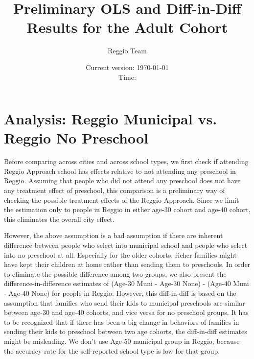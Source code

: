 



\title{Preliminary OLS and Diff-in-Diff Results for the Adult Cohort}
\author{Reggio Team}
\date{Current version: \today \\ \vspace{1em} Time: \currenttime}
\maketitle


\doublespacing
\listoftables

\section{Analysis: Reggio Municipal vs. Reggio No Preschool}
\label{sec:reggio_muninone}

Before comparing across cities and across school types, we first check if attending Reggio Approach school has effects relative to not attending any preschool in Reggio. Assuming that people who did not attend any preschool does not have any treatment effect of preschool, this comparison is a preliminary way of checking the possible treatment effects of the Reggio Approach. Since we limit the estimation only to people in Reggio in either age-30 cohort and age-40 cohort, this eliminates the overall city effect. 

However, the above assumption is a bad assumption if there are inherent difference between people who select into municipal school and people who select into no preschool at all. Especially for the older cohorts, richer families might have kept their children at home rather than sending them to preschools. In order to eliminate the possible difference among two groups, we also present the difference-in-difference estimates of (Age-30 Muni - Age-30 None) - (Age-40 Muni - Age-40 None) for people in Reggio. However, this diff-in-diff is based on the assumption that families who send their kids to municipal preschools are similar between age-30 and age-40 cohorts, and vice versa for no preschool groups. It has to be recognized that if there has been a big change in behaviors of families in sending their kids to preschool between two age cohorts, the diff-in-diff estimates might be misleading. We don't use Age-50 municipal group in Reggio, because the accuracy rate for the self-reported school type is low for that group. \\\

